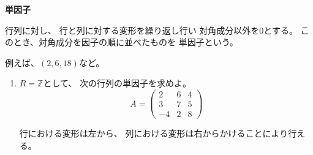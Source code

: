\documentclass[12pt,b5paper]{ltjsarticle}
\begin{document}
\hrulefill

\textbf{単因子}

行列に対し、
行と列に対する変形を繰り返し行い
対角成分以外を$0$とする。
このとき、対角成分を因子の順に並べたものを
単因子という。

例えば、$(2,6,18)$など。


\hrulefill

\begin{enumerate}
 \item
      $R=\mathbb{Z}$として、
      次の行列の単因子を求めよ。
      \begin{equation}
       A=
        \begin{pmatrix}
         2 & 6 & 4 \\
         3 & 7 & 5 \\
         -4 & 2 & 8
        \end{pmatrix}
      \end{equation}

      \dotfill

      行における変形は左から、
      列における変形は右からかけることにより行える。


\end{enumerate}
\end{document}
